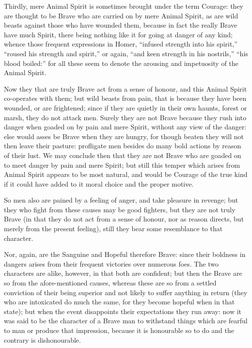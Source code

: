Thirdly, mere Animal Spirit is sometimes brought under the term Courage: they
are thought to be Brave who are carried on by mere Animal Spirit, as are wild
beasts against those who have wounded them, because in fact the really Brave
have much Spirit, there being nothing like it for going at danger of any kind;
whence those frequent expressions in Homer, “infused strength into his
spirit,” “roused his strength and spirit,” or again,
“and keen strength in his nostrils,” “his blood
boiled:” for all these seem to denote the arousing and impetuosity of the
Animal Spirit.

Now they that are truly Brave act from a sense of honour, and this Animal
Spirit co-operates with them; but wild beasts from pain, that is because they
have been wounded, or are frightened; since if they are quietly in their own
haunts, forest or marsh, they do not attack men. Surely they are not Brave
because they rush into danger when goaded on by pain and mere Spirit, without
any view of the danger: else would asses be Brave when they are hungry, for
though beaten they will not then leave their pasture: profligate men besides do
many bold actions by reason of their lust. We may conclude then that they are
not Brave who are goaded on to meet danger by pain and mere Spirit; but still
this temper which arises from Animal Spirit appears to be most natural, and
would be Courage of the true kind if it could have added to it moral choice and
the proper motive.

So men also are pained by a feeling of anger, and take pleasure in revenge; but
they who fight from these causes may be good fighters, but they are not truly
Brave (in that they do not act from a sense of honour, nor as reason directs,
but merely from the present feeling), still they bear some resemblance to that
character.

Nor, again, are the Sanguine and Hopeful therefore Brave: since their boldness
in dangers arises from their frequent victories over numerous foes. The two
characters are alike, however, in that both are confident; but then the Brave
are so from the afore-mentioned causes, whereas these are so from a settled
conviction of their being superior and not likely to suffer anything in return
(they who are intoxicated do much the same, for they become hopeful when in
that state); but when the event disappoints their expectations they run away:
now it was said to be the character of a Brave man to withstand things which
are fearful to man or produce that impression, because it is honourable so to
do and the contrary is dishonourable.


